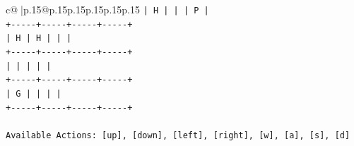 \documentclass{article}
\begin{document}
{\begin{supertabular}{c@{$\;$}|p{.15\linewidth}@{}p{.15\linewidth}p{.15\linewidth}p{.15\linewidth}p{.15\linewidth}p{.15\linewidth}}
{{{\texttt{|  H  |     |     |  P  |} \\
\texttt{+{-}{-}{-}{-}{-}+{-}{-}{-}{-}{-}+{-}{-}{-}{-}{-}+{-}{-}{-}{-}{-}+} \\
\texttt{|  H  |  H  |     |     |} \\
\texttt{+{-}{-}{-}{-}{-}+{-}{-}{-}{-}{-}+{-}{-}{-}{-}{-}+{-}{-}{-}{-}{-}+} \\
\texttt{|     |     |     |     |} \\
\texttt{+{-}{-}{-}{-}{-}+{-}{-}{-}{-}{-}+{-}{-}{-}{-}{-}+{-}{-}{-}{-}{-}+} \\
\texttt{|  G  |     |     |     |} \\
\texttt{+{-}{-}{-}{-}{-}+{-}{-}{-}{-}{-}+{-}{-}{-}{-}{-}+{-}{-}{-}{-}{-}+} \\
\\ 
\texttt{Available Actions: {[}up{]}, {[}down{]}, {[}left{]}, {[}right{]}, {[}w{]}, {[}a{]}, {[}s{]}, {[}d{]}} \\
            }
        }
    }
     \\ \\


\end{supertabular}}
\end{document}
